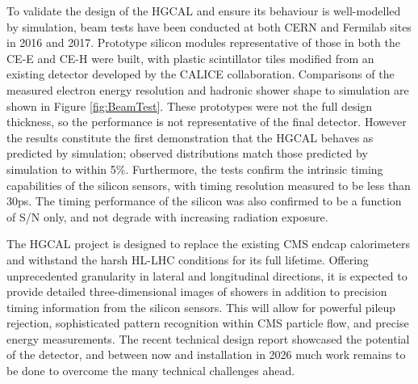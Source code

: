 To validate the design of the HGCAL and ensure its behaviour is well-modelled by simulation, beam tests have been conducted at both CERN and Fermilab sites in 2016 and 2017. 
Prototype silicon modules representative of those in both the CE-E and CE-H were built, with plastic scintillator tiles modified from an existing detector developed by the CALICE collaboration.
Comparisons of the measured electron energy resolution and hadronic shower shape to simulation are shown in Figure \ref{fig:BeamTest}.
These prototypes were not the full design thickness, so the performance is not representative of the final detector.
However the results constitute the first demonstration that the HGCAL behaves as predicted by simulation; observed distributions match those predicted by simulation to within 5\%. 
Furthermore, the tests confirm the intrinsic timing capabilities of the silicon sensors, with timing resolution measured to be less than 30ps.
The timing performance of the silicon was also confirmed to be a function of S/N only, and not degrade with increasing radiation exposure. 

The HGCAL project is designed to replace the existing CMS endcap calorimeters and withstand the harsh HL-LHC conditions for its full lifetime.
Offering unprecedented granularity in lateral and longitudinal directions, it is expected to provide detailed three-dimensional images of showers in addition to precision timing information from the silicon sensors. 
This will allow for powerful pileup rejection, sophisticated pattern recognition within CMS particle flow, and precise energy measurements. 
The recent technical design report showcased the potential of the detector, and between now and installation in 2026 much work remains to be done to overcome the many technical challenges ahead.
